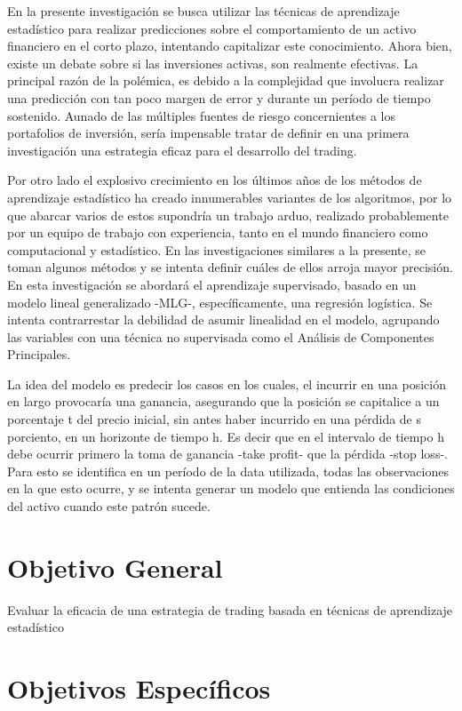 \documentclass[a4paper,12pt]{Latex/Classes/PhDthesisPSnPDF}
\begin{document}
En la presente investigación se busca utilizar las técnicas de aprendizaje estadístico para realizar predicciones sobre el comportamiento de un activo financiero en el corto  plazo, intentando capitalizar este conocimiento. Ahora bien, existe un debate sobre si las inversiones activas, son realmente efectivas. La principal razón de la polémica, es debido a la complejidad que involucra realizar una predicción con tan poco margen de error y durante un período de tiempo sostenido. Aunado de las múltiples fuentes de riesgo concernientes a los portafolios de inversión, sería impensable tratar de definir en una primera investigación una estrategia eficaz para el desarrollo del trading.

Por otro lado el explosivo crecimiento en los últimos años de los métodos de aprendizaje estadístico ha creado innumerables variantes de los algoritmos, por lo que abarcar varios de estos supondría un trabajo arduo, realizado probablemente por un equipo de trabajo con experiencia, tanto en el mundo financiero como computacional y estadístico. En las investigaciones similares a la presente, se toman algunos métodos y se intenta definir cuáles de ellos arroja mayor precisión. En esta investigación se abordará el aprendizaje supervisado, basado en un modelo lineal generalizado -MLG-, específicamente, una regresión logística. Se intenta contrarrestar la debilidad de asumir linealidad en el modelo, agrupando las variables con una técnica no supervisada como el Análisis de Componentes Principales.

La idea del modelo es predecir los casos en los cuales, el incurrir en una posición en largo provocaría una ganancia, asegurando que la posición se capitalice a un porcentaje t del precio inicial, sin antes haber incurrido en una pérdida de s porciento, en un horizonte de tiempo h. Es decir que en el intervalo de tiempo h debe ocurrir primero la toma de ganancia -take profit- que la pérdida -stop loss-. Para esto se identifica en un período de la data utilizada, todas las observaciones en la que esto ocurre, y se intenta generar un modelo que entienda las condiciones del activo cuando este patrón sucede.

\section{Objetivo General}

Evaluar la eficacia de una estrategia de trading basada en técnicas de aprendizaje estadístico

\section{Objetivos Específicos}
\end{document}
